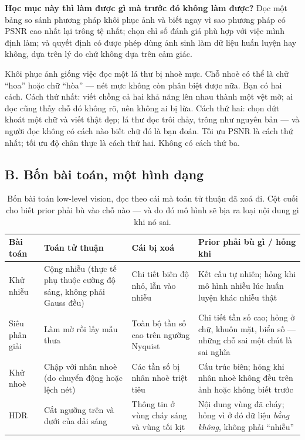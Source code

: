 \documentclass[../../../deep_learning.tex]{subfiles}
\begin{document}
\textbf{Học mục này thì làm được gì mà trước đó không làm được?} Đọc một bảng so sánh phương pháp khôi phục ảnh và biết ngay vì sao phương pháp có PSNR cao nhất lại trông tệ nhất; chọn chỉ số đánh giá phù hợp với việc mình định làm; và quyết định có được phép dùng ảnh sinh làm dữ liệu huấn luyện hay không, dựa trên lý do chứ không dựa trên cảm giác.

\begin{trucgiac}
Khôi phục ảnh giống việc đọc một lá thư bị nhoè mực. Chỗ nhoè có thể là chữ ``hoa'' hoặc chữ ``hòa'' --- nét mực không còn phân biệt được nữa. Bạn có hai cách. Cách thứ nhất: viết chồng cả hai khả năng lên nhau thành một vệt mờ; ai đọc cũng thấy chỗ đó không rõ, nên không ai bị lừa. Cách thứ hai: chọn dứt khoát một chữ và viết thật đẹp; lá thư đọc trôi chảy, trông như nguyên bản --- và người đọc không có cách nào biết chữ đó là bạn đoán. Tối ưu PSNR là cách thứ nhất; tối ưu độ chân thực là cách thứ hai. Không có cách thứ ba.
\end{trucgiac}

\subsection{B. Bốn bài toán, một hình dạng}

\begin{table}[H]\centering\small
\caption{Bốn bài toán low-level vision, đọc theo cái mà toán tử thuận đã xoá đi. Cột cuối cho biết prior phải bù vào chỗ nào --- và do đó mô hình sẽ bịa ra loại nội dung gì khi nó sai.}
\label{tab:bon-bai-toan-ll}
\begin{tabularx}{\linewidth}{@{}L{2.3cm}L{3.2cm}YY@{}}
\toprule
\textbf{Bài toán} & \textbf{Toán tử thuận} & \textbf{Cái bị xoá} & \textbf{Prior phải bù gì / hỏng khi}\\
\midrule
Khử nhiễu & Cộng nhiễu (thực tế phụ thuộc cường độ sáng, không phải Gauss đều) & Chi tiết biên độ nhỏ, lẫn vào nhiễu & Kết cấu tự nhiên; hỏng khi mô hình nhiễu lúc huấn luyện khác nhiễu thật\\
Siêu phân giải & Làm mờ rồi lấy mẫu thưa & Toàn bộ tần số cao trên ngưỡng Nyquist & Chi tiết tần số cao; hỏng ở chữ, khuôn mặt, biển số --- những chỗ sai một chút là sai nghĩa\\
Khử nhoè & Chập với nhân nhoè (do chuyển động hoặc lệch nét) & Các tần số bị nhân nhoè triệt tiêu & Cấu trúc biên; hỏng khi nhân nhoè không đều trên ảnh hoặc không biết trước\\
HDR & Cắt ngưỡng trên và dưới của dải sáng & Thông tin ở vùng cháy sáng và vùng tối kịt & Nội dung vùng đã cháy; hỏng vì ở đó dữ liệu \emph{bằng không}, không phải ``nhiễu''\\
\bottomrule
\end{tabularx}
\end{table}
\end{document}
